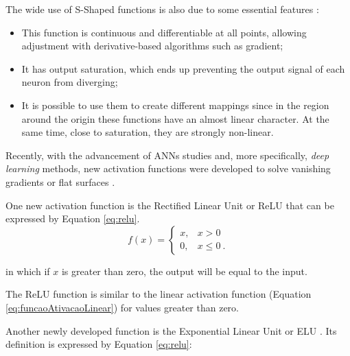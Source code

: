 The wide use of S-Shaped functions is also due to 
some 
essential features \cite{Menon1996}:

\begin{itemize}
    \item %
    This function is continuous and differentiable at all points, allowing adjustment with derivative-based algorithms such as gradient;
    \item It has 
    output saturation, which ends up preventing the output signal of each neuron from diverging;
    \item It is possible to use them to create different mappings since 
    in the region around the origin 
    these functions 
    have an almost linear character. At the same time, close to saturation, they are strongly non-linear.
\end{itemize}


Recently, with the advancement of ANNs studies and, more specifically, \textit{deep learning} methods, new activation functions were developed to solve vanishing gradients or flat surfaces \cite{Fahlman1988}.

One new activation function is the Rectified Linear Unit or ReLU \cite{Maas2013} %
that can be expressed by Equation \ref{eq:relu}.
\begin{equation}
	\label{eq:relu}
	f(x) = \left\{\begin{matrix}
		x, & x > 0    \\
		0, & x \leq 0 \:.
	\end{matrix}\right.
\end{equation}

\noindent
in which if $x$ is greater than zero, the output will be equal to the input.

The ReLU function is similar to the linear activation function (Equation \ref{eq:funcaoAtivacaoLinear}) for values greater than zero. %

Another newly developed function is the Exponential Linear Unit or ELU \cite{Clevert2016}. Its definition is expressed by Equation \ref{eq:relu}:


